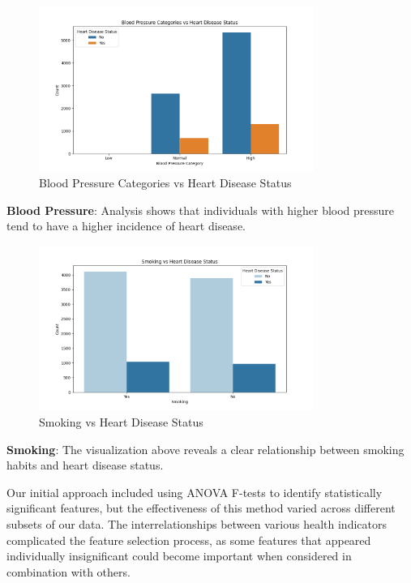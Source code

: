 \documentclass[11pt,a4paper]{article}
\begin{document}
\begin{figure}[H]
    \centering
    \includegraphics[width=0.8\textwidth]{./pictures/blood_pressure_categories_vs_heart_disease_status.png}
    \caption{Blood Pressure Categories vs Heart Disease Status}
\end{figure}

\textbf{Blood Pressure}: Analysis shows that individuals with higher blood pressure tend to have a higher incidence of heart disease.

\begin{figure}[H]
    \centering
    \includegraphics[width=0.8\textwidth]{./pictures/smoking_vs_heart_disease_status.png}
    \caption{Smoking vs Heart Disease Status}
\end{figure}

\textbf{Smoking}: The visualization above reveals a clear relationship between smoking habits and heart disease status.

Our initial approach included using ANOVA
F-tests to identify statistically significant features, but the
effectiveness of this method varied across different subsets
of our data.
The interrelationships between various health indicators complicated the feature
selection process, as some features that appeared
individually insignificant could become important when
considered in combination with others.
\end{document}
